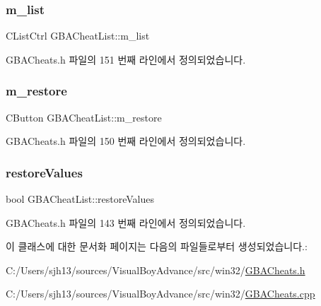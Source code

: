 \subsubsection{\texorpdfstring{m\+\_\+list}{m\_list}}
{\footnotesize\ttfamily C\+List\+Ctrl G\+B\+A\+Cheat\+List\+::m\+\_\+list}



G\+B\+A\+Cheats.\+h 파일의 151 번째 라인에서 정의되었습니다.

\mbox{\label{class_g_b_a_cheat_list_a4ed2a681da3265741caacda87cf36825}} 
\subsubsection{\texorpdfstring{m\+\_\+restore}{m\_restore}}
{\footnotesize\ttfamily C\+Button G\+B\+A\+Cheat\+List\+::m\+\_\+restore}



G\+B\+A\+Cheats.\+h 파일의 150 번째 라인에서 정의되었습니다.

\mbox{\label{class_g_b_a_cheat_list_a5a6fa66317a2fdab0f9880bd2056c1d0}} 
\subsubsection{\texorpdfstring{restore\+Values}{restoreValues}}
{\footnotesize\ttfamily bool G\+B\+A\+Cheat\+List\+::restore\+Values}



G\+B\+A\+Cheats.\+h 파일의 143 번째 라인에서 정의되었습니다.



이 클래스에 대한 문서화 페이지는 다음의 파일들로부터 생성되었습니다.\+:\begin{DoxyCompactItemize}
\item 
C\+:/\+Users/sjh13/sources/\+Visual\+Boy\+Advance/src/win32/\mbox{\hyperlink{_g_b_a_cheats_8h}{G\+B\+A\+Cheats.\+h}}\item 
C\+:/\+Users/sjh13/sources/\+Visual\+Boy\+Advance/src/win32/\mbox{\hyperlink{_g_b_a_cheats_8cpp}{G\+B\+A\+Cheats.\+cpp}}\end{DoxyCompactItemize}
